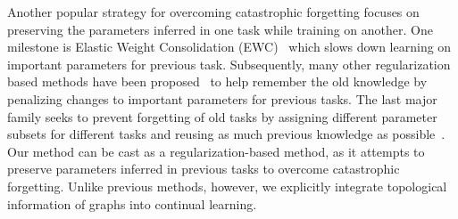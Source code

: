 \documentclass[letterpaper]{article} %
\begin{document}
Another popular strategy for overcoming catastrophic forgetting focuses on preserving the parameters inferred in one task while training on another.
One milestone is Elastic Weight Consolidation (EWC)~\cite{kirkpatrick2017overcoming} 
which slows down learning on important parameters for  previous task.
Subsequently, many other regularization based methods have been proposed~\cite{zenke2017continual, lee2017overcoming, li2017learning, aljundi2018memory, mallya2018packnet} to help remember the old knowledge by penalizing changes to important parameters for previous tasks. 
The last major family seeks to prevent forgetting of  old tasks by assigning different parameter subsets for different tasks and reusing as much previous knowledge as possible~\cite{french1994dynamically, chen2015net2net, rusu2016progressive, schwarz2018progress,  serra2018overcoming}.  
Our method can be cast as a regularization-based method, 
as it attempts to preserve  parameters inferred in  
previous tasks to overcome catastrophic forgetting.
Unlike previous methods, however, we explicitly 
integrate  topological  information of graphs into 
continual learning.
\end{document}
